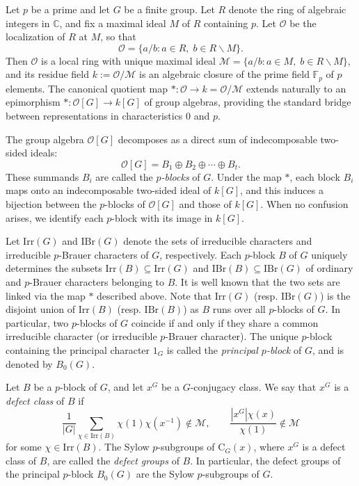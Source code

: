 \documentclass[10pt]{article}
\begin{document}
Let $p$ be a prime and let $G$ be a finite group. 
Let $R$ denote the ring of algebraic integers in $\mathbb{C}$, and fix a maximal ideal $M$ of $R$ containing $p$.
Let $\mathcal{O}$ be the localization of $R$ at $M$, so that
$$\mathcal{O}=\{ a/b: a\in R,\; b\in R\smallsetminus M \}.$$
Then $\mathcal{O}$ is a local ring with unique maximal ideal $\mathcal{M}=\{ a/b:a\in M,\; b\in R\smallsetminus M \}$,
and its residue field $k := \mathcal{O}/\mathcal{M}$ is an algebraic closure of the prime field $\mathbb{F}_p$ of $p$ elements.
The canonical quotient map $* \colon \mathcal{O} \to k = \mathcal{O}/\mathcal{M}$ extends naturally to an epimorphism $* \colon \mathcal{O}[G] \to k[G]$ of group algebras, providing the standard bridge between representations in characteristics 0 and $p$.



The group algebra $\mathcal{O}[G]$ decomposes as a direct sum of indecomposable two-sided ideals:
\[
\mathcal{O}[G] = B_1 \oplus B_2 \oplus \cdots \oplus B_t.
\]
These summands $B_i$ are called the \emph{$p$-blocks} of $G$.
Under the map $*$, each block $B_i$ maps onto an indecomposable two-sided ideal of $k[G]$, and this induces a bijection between the $p$-blocks of $\mathcal{O}[G]$ and those of $k[G]$. When no confusion arises, we identify each $p$-block with its image in $k[G]$.

Let $\mathrm{Irr}(G)$ and $\mathrm{IBr}(G)$ denote the sets of irreducible characters and irreducible $p$-Brauer characters of $G$, respectively.
Each $p$-block $B$ of $G$ uniquely determines the subsets $\mathrm{Irr}(B) \subseteq \mathrm{Irr}(G)$ and $\mathrm{IBr}(B) \subseteq \mathrm{IBr}(G)$ of ordinary and $p$-Brauer characters belonging to $B$.
It is well known that
the two sets are linked via the map $*$ described above.
Note that $\mathrm{Irr}(G)$ (resp. $\mathrm{IBr}(G)$) is the disjoint union of $\mathrm{Irr}(B)$ (resp. $\mathrm{IBr}(B)$) as $B$ runs over all $p$-blocks of $G$.
In particular, two $p$-blocks of $G$ coincide if and only if they 
share a common irreducible character (or irreducible $p$-Brauer character).
The unique $p$-block containing the principal character $1_G$ is called the \emph{principal $p$-block} of $G$, and is denoted by $B_0(G)$.


Let $B$ be a $p$-block of $G$, and let $x^G$ be a $G$-conjugacy class. We say that $x^G$ is a \emph{defect class} of $B$ if
\[
\frac{1}{|G|}\sum_{\chi\in \mathrm{Irr}(B)} \chi(1)\chi(x^{-1}) \notin \mathcal{M},\qquad \frac{|x^G|\chi(x)}{\chi(1)} \notin \mathcal{M}
\]
for some $\chi\in \mathrm{Irr}(B)$. The Sylow $p$-subgroups of $\mathrm{C}_{G}(x)$, where $x^G$ is a defect class of $B$, are called the \emph{defect groups} of $B$. In particular, the defect groups of the principal $p$-block $B_0(G)$ are the Sylow $p$-subgroups of $G$.
\end{document}
